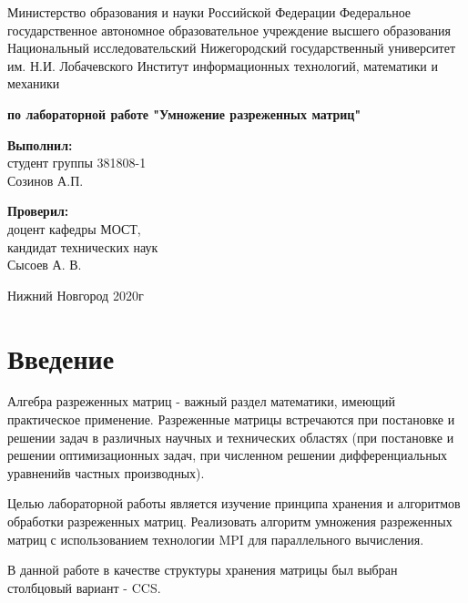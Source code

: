 \documentclass{report}
\begin{document}
\begin{titlepage}

\begin{center}Министерство образования и науки Российской Федерации 
Федеральное государственное автономное образовательное учреждение 
высшего образования \\ Национальный исследовательский 
Нижегородский государственный университет им. Н.И. Лобачевского 
Институт информационных технологий, математики и механики

\vspace{8em}
\textbf{ по лабораторной работе "Умножение разреженных матриц"} \end{center}

\vspace{8em}

\begin{flushright}  \textbf{Выполнил:} \\ студент группы 381808-1  \\ Созинов А.П. \end{flushright}
\begin{flushright}  \textbf{Проверил:}  \\ доцент кафедры МОСТ, \\ кандидат технических наук \\ Сысоев А. В.\\ \end{flushright}

\vspace{\fill}
\begin{center} Нижний Новгород  2020г \end{center}
\end{titlepage}

\setcounter{page}{2}

\tableofcontents

\newpage
\section*{Введение}
\par Алгебра разреженных матриц - важный раздел математики, имеющий практическое применение. Разреженные матрицы
встречаются при постановке и решении задач в различных научных и технических областях (при постановке и решении оптимизационных задач,
при численном решении дифференциальных уравненийв частных производных).
\par Целью лабораторной работы является изучение принципа хранения и алгоритмов обработки разреженных матриц. Реализовать алгоритм умножения разреженных матриц с использованием технологии MPI для параллельного вычисления.
\par В данной работе в качестве структуры хранения матрицы был выбран столбцовый вариант - CCS. 
\end{document}
